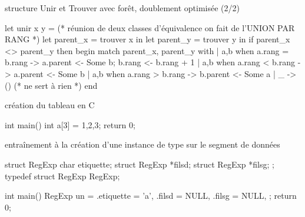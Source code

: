 \begin{adjustwidth}{-3cm}{-3cm}
\begin{implementation}{structure Unir et Trouver avec forêt, doublement optimisée (2/2)}
    \begin{lstOCaml}
    let unir x y =
     (* réunion de deux classes d'équivalence 
        on fait de l'UNION PAR RANG *)
        let parent_x = trouver x in
        let parent_y = trouver y in
        if parent_x <> parent_y then begin
            match parent_x, parent_y with
            | a,b when a.rang = b.rang ->
                a.parent <- Some b;
                b.rang <- b.rang + 1
            | a,b when a.rang < b.rang -> a.parent <- Some b
            | a,b when a.rang > b.rang -> b.parent <- Some a
            | _ -> () (* ne sert à rien *)
        end
    \end{lstOCaml}
\end{implementation}

\begin{implementation}{création du tableau \code{[1,2,3]} en C}
    \begin{lstC}
    int main(){
        int a[3] = {1,2,3};
        return 0;
    }
    \end{lstC}
\end{implementation}

\begin{implementation}{entraînement à la création d'une instance de type sur le segment de données}
    \begin{lstC}
    struct RegExp{
        char etiquette;
        struct RegExp *filsd;
        struct RegExp *filsg;
    };
    typedef struct RegExp RegExp;
    
    
    int main(){
        RegExp un = {
            .etiquette = 'a',
            .filsd = NULL,
            .filsg = NULL,
        };
        return 0;
    }
    \end{lstC}
\end{implementation}


\end{adjustwidth}
